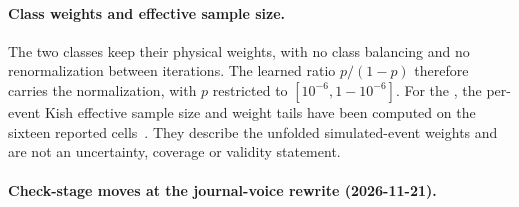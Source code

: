 \paragraph{Class weights and effective sample size.} The two classes keep their physical weights, with no class balancing and no renormalization between iterations. The learned ratio $p/(1-p)$ therefore carries the normalization, with $p$ restricted to $[10^{-6},1-10^{-6}]$. For the \estMultiD{}, the per-event Kish effective sample size and weight tails have been computed on the sixteen reported cells~\cite{UnfoldedWeightsESS2026}. They describe the unfolded simulated-event weights and are not an uncertainty, coverage or validity statement.

\paragraph{Check-stage moves at the journal-voice rewrite (2026-11-21).}


